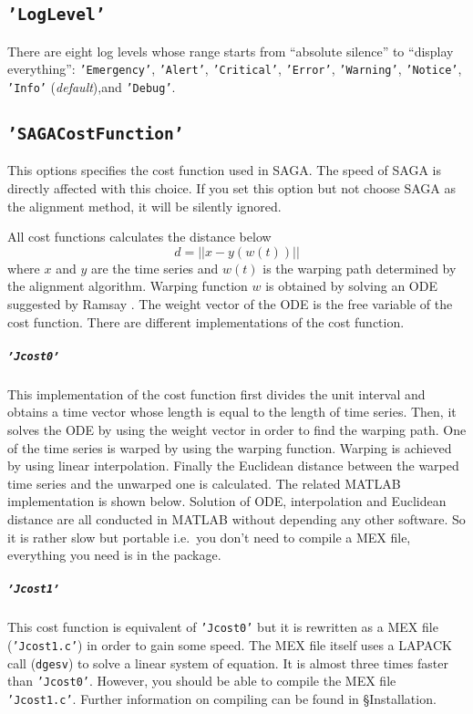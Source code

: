 \documentclass{article}
\newcommand{\parametre}[1]{\texttt{#1}}
\newcommand{\matlabfile}[1]{}
\begin{document}
\subsection{\parametre{'LogLevel'}}
There are eight log levels whose range starts from ``absolute silence'' to ``display everything'': \parametre{'Emergency'}, \parametre{'Alert'}, \parametre{'Critical'}, \parametre{'Error'}, \parametre{'Warning'}, \parametre{'Notice'}, \parametre{'Info'} (\textit{default}),and \parametre{'Debug'}.  
 
\subsection{\parametre{'SAGACostFunction'}} 
This options specifies the cost function used in SAGA.\@ 
The speed of SAGA is directly affected with this choice. If you set this option but not choose SAGA as the alignment method, it will be silently ignored.

All cost functions calculates the distance below 
$$ d = || x - y(w(t)) ||$$
where $x$ and $y$ are the time series and $w(t)$ is the warping path determined by the alignment algorithm. Warping function $w$ is obtained by solving an ODE suggested by Ramsay \cite{Ramsay1998}. The weight vector of the ODE is the free variable of the cost function. There are different implementations of the cost function.

\subparagraph*{\parametre{'Jcost0'}} This implementation of the cost function first divides the unit interval and obtains a time vector whose length is equal to the length of time series. 
Then, it solves the ODE by using the weight vector in order to find the warping path. 
One of the time series is warped by using the warping function. 
Warping is achieved by using linear interpolation. 
Finally the Euclidean distance between the warped time series and the unwarped one is calculated. 
The related MATLAB implementation is shown below. 
Solution of ODE, interpolation and Euclidean distance are all conducted in MATLAB without depending any other software. 
So it is rather slow but portable i.e.\ you don't need to compile a MEX file, everything you need is in the package. 

\begin{scriptsize}
\matlabfile{tscu_manual_verbatim03.out}
\end{scriptsize}

\subparagraph*{\parametre{'Jcost1'}} This cost function is equivalent of \parametre{'Jcost0'} but it is rewritten as a MEX file (\parametre{'Jcost1.c'}) in order to gain some speed. The MEX file itself uses a LAPACK call (\parametre{dgesv}) to solve a linear system of equation. It is almost three times faster than \parametre{'Jcost0'}. However, you should be able to compile the MEX file \parametre{'Jcost1.c'}. Further information on compiling can be found in \S Installation.
\end{document}
